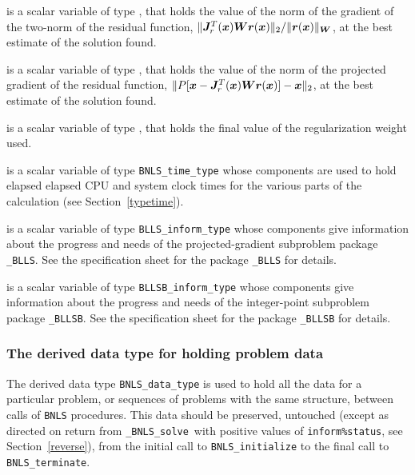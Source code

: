 \documentclass{galahad}
\newcommand{\packagename}{BNLS}
\newcommand{\fullpackagename}{\libraryname\_\packagename}
\newcommand{\solver}{{\tt \fullpackagename\_solve}}
\begin{document}
\begin{description}
 is a scalar variable of type \realdp, that holds the
value of the norm of the gradient of the two-norm of the residual function,
$\|{\bm{J}}_r^T({\bm{x}}) {\bm{W}} {\bm{r}}({\bm{x}})\|_2/\|{\bm{r}}({\bm{x}})\|_{{\bm{W}}}$, at the best estimate
of the solution found.

 is a scalar variable of type \realdp, that holds the
value of the norm of the projected gradient of the residual function,
$\|P[{\bm{x}} - {\bm{J}}_r^T({\bm{x}}) {\bm{W}} {\bm{r}}({\bm{x}})] - {\bm{x}}\|_2$, at the best 
estimate of the solution found.

 is a scalar variable of type \realdp, that holds the
final value of the regularization weight used.

 is a scalar variable of type {\tt \packagename\_time\_type}
whose components are used to hold elapsed elapsed CPU and system clock
times for the various parts of the calculation (see Section~\ref{typetime}).

 is a scalar variable of type
{\tt BLLS\_inform\_type}
whose components give information about the progress and needs
of the projected-gradient subproblem package
{\tt \libraryname\_BLLS}.
See the specification sheet for the package
{\tt \libraryname\_BLLS}
for details.

 is a scalar variable of type
{\tt BLLSB\_inform\_type}
whose components give information about the progress and needs
of the integer-point subproblem package
{\tt \libraryname\_BLLSB}.
See the specification sheet for the package
{\tt \libraryname\_BLLSB}
for details.

\end{description}


\subsubsection{The derived data type for holding problem data}\label{typedata}
The derived data type
{\tt \packagename\_data\_type}
is used to hold all the data for a particular problem,
or sequences of problems with the same structure, between calls of
{\tt \packagename} procedures.
This data should be preserved, untouched (except as directed on
return from \solver\ with positive values of {\tt inform\%status}, see
Section~\ref{reverse}),
from the initial call to
{\tt \packagename\_initialize}
to the final call to
{\tt \packagename\_terminate}.

\end{document}
